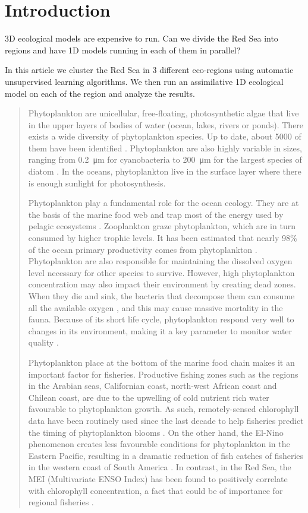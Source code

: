 \section{Introduction}

3D ecological models are expensive to run. Can we divide the Red Sea into
regions and have 1D models running in each of them in parallel?

In this article we cluster the Red Sea in 3 different eco-regions using
automatic unsupervised learning algorithms. We then run an assimilative 1D
ecological model on each of the region and analyze the results.

\begin{quotation} 

Phytoplankton are unicellular, free-floating, photosynthetic
algae that live in the upper layers of bodies of water (ocean, lakes, rivers or
ponds). There exists a wide diversity of phytoplankton species. Up to date,
about 5000 of them have been identified \citep{Tett1995}. Phytoplankton are
also highly variable in sizes, ranging from \SI{0.2}{\micro\metre} for
cyanobacteria to \SI{200}{\micro\metre} for the largest species of diatom
\citep{Pal2014}. In the oceans, phytoplankton live in the surface layer where
there is enough sunlight for photosynthesis. 

Phytoplankton play a fundamental role for the ocean ecology. They are at the
basis of the marine food web and trap most of the energy used by pelagic
ecosystems \citep{Pal2014}. Zooplankton graze phytoplankton, which are in turn
consumed by higher trophic levels. It has been estimated that nearly 98\% of
the ocean primary productivity comes from phytoplankton \citep{Pal2014}.
Phytoplankton are also responsible for maintaining the dissolved oxygen level
necessary for other species to survive. However, high phytoplankton
concentration may also impact their environment by creating dead zones. When
they die and sink, the bacteria that decompose them can consume all the
available oxygen \citep{Pal2014}, and this may cause massive mortality in the
fauna. Because of its short life cycle, phytoplankton respond very well to
changes in its environment, making it a key parameter to monitor water quality
\citep{Wu2014}.

Phytoplankton place at the bottom of the marine food chain makes it an
important factor for fisheries. Productive fishing zones such as the regions in
the Arabian seas, Californian coast, north-west African coast and Chilean
coast, are due to the upwelling of cold nutrient rich water favourable to
phytoplankton growth. As such, remotely-sensed chlorophyll data have been
routinely used since the last decade to help fisheries predict the timing of
phytoplankton blooms \citep{Robinson2010}. On the other hand, the El-Nino
phenomenon creates less favourable conditions for phytoplankton in the Eastern
Pacific, resulting in a dramatic reduction of fish catches of fisheries in the
western coast of South America \citep{Robinson2010}. In contrast, in the Red
Sea, the MEI (Multivariate ENSO Index) has been found to positively correlate
with chlorophyll concentration, a fact that could be of importance for regional
fisheries \citep{Raitsos2015}.


\end{quotation}
